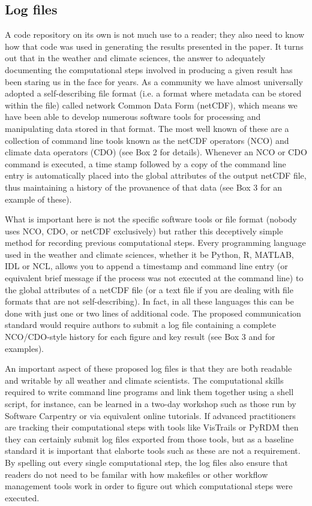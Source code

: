 \subsection{Log files}\label{s:log_files}

A code repository on its own is not much use to a reader; they also need to know how that code was used in generating the results presented in the paper. It turns out that in the weather and climate sciences, the answer to adequately documenting the computational steps involved in producing a given result has been staring us in the face for years. As a community we have almost universally adopted a self-describing file format (i.e. a format where metadata can be stored within the file) called network Common Data Form (netCDF), which means we have been able to develop numerous software tools for processing and manipulating data stored in that format. The most well known of these are a collection of command line tools known as the netCDF operators (NCO) and climate data operators (CDO) (see Box 2 for details). Whenever an NCO or CDO command is executed, a time stamp followed by a copy of the command line entry is automatically placed into the global attributes of the output netCDF file, thus maintaining a history of the provanence of that data (see Box 3 for an example of these).

What is important here is not the specific software tools or file format (nobody uses NCO, CDO, or netCDF exclusively) but rather this deceptively simple method for recording previous computational steps. Every programming language used in the weather and climate sciences, whether it be Python, R, MATLAB, IDL or NCL, allows you to append a timestamp and command line entry (or equivalent brief message if the process was not executed at the command line) to the global attributes of a netCDF file (or a text file if you are dealing with file formats that are not self-describing). In fact, in all these languages this can be done with just one or two lines of additional code. The proposed communication standard would require authors to submit a log file containing a complete NCO/CDO-style history for each figure and key result (see Box 3 and \citet{Irving2015} for examples).

An important aspect of these proposed log files is that they are both readable and writable by all weather and climate scientists. The computational skills required to write command line programs and link them together using a shell script, for instance, can be learned in a two-day workshop such as those run by Software Carpentry \citep{Wilson2014} or via equivalent online tutorials. If advanced practitioners are tracking their computational steps with tools like VisTrails or PyRDM then they can certainly submit log files exported from those tools, but as a baseline standard it is important that elaborte tools such as these are not a requirement. By spelling out every single computational step, the log files also ensure that readers do not need to be familar with how makefiles or other workflow management tools work in order to figure out which computational steps were executed.  

